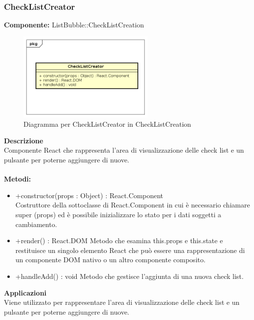 \subsubsection{CheckListCreator}
\textbf{Componente:}  ListBubble::CheckListCreation\\
   \FloatBarrier
   \begin{figure}[ht]
   \centering
   \includegraphics[width=0.6\textwidth]{img/single-CheckListCreator}
   \caption{{Diagramma per CheckListCreator in CheckListCreation}}
\end{figure}
\FloatBarrier
\textbf{Descrizione}\\
Componente React che rappresenta l'area di visualizzazione delle check list e un pulsante per poterne aggiungere di nuove. 
\\
\\
\textbf{Metodi:} 
\begin{itemize}
\item +constructor(props : Object) : React.Component 
\\
Costruttore della sottoclasse di React.Component in cui è necessario chiamare super (props) ed è possibile inizializzare lo stato per i dati soggetti a cambiamento.

\item +render() : React.DOM
Metodo che esamina this.props e this.state e restituisce un singolo elemento React che può essere una rappresentazione di un componente DOM nativo o un altro componente composito.

\item +handleAdd() : void
Metodo che gestisce l'aggiunta di una nuova check list. 
\end{itemize} 


\textbf{Applicazioni}\\
Viene utilizzato per rappresentare l'area di visualizzazione delle check list e un pulsante per poterne aggiungere di nuove. 


\clearpage

